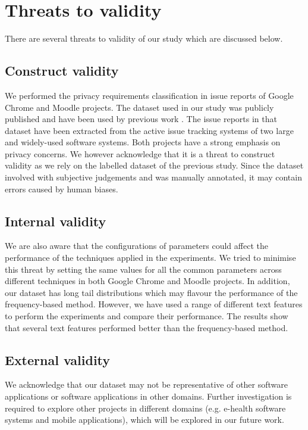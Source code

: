 \section{Threats to validity}  \label{sec:threats}

There are several threats to validity of our study which are discussed below. 

\subsection{Construct validity}
We performed the privacy requirements classification in issue reports of Google Chrome and Moodle projects. The dataset used in our study was publicly published and have been used by previous work \cite{Sangaroonsilp2023}. The issue reports in that dataset have been extracted from the active issue tracking systems of two large and widely-used software systems. Both projects have a strong emphasis on privacy concerns. We however acknowledge that it is a threat to construct validity as we rely on the labelled dataset of the previous study. Since the dataset involved with subjective judgements and was manually annotated, it may contain errors caused by human biases. 

\subsection{Internal validity}
We are also aware that the configurations of parameters could affect the performance of the techniques applied in the experiments. We tried to minimise this threat by setting the same values for all the common parameters across different techniques in both Google Chrome and Moodle projects. In addition, our dataset has long tail distributions which may flavour the performance of the frequency-based method. However, we have used a range of different text features to perform the experiments and compare their performance. The results show that several text features performed better than the frequency-based method.

\subsection{External validity}
We acknowledge that our dataset may not be representative of other software applications or software applications in other domains. Further investigation is required to explore other projects in different domains (e.g. e-health software systems and mobile applications), which will be explored in our future work. 